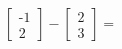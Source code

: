 \documentclass[preview]{standalone}
\begin{document}
\begin{align*}
\begin{bmatrix} \text{-}1 \\ 2 \end{bmatrix} - \begin{bmatrix} 2 \\ 3 \end{bmatrix}=
\end{align*}
\end{document}
